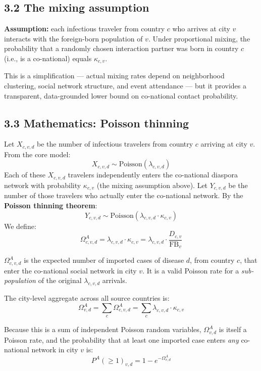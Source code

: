 \documentclass[11pt]{article}
\begin{document}
\subsection*{3.2 The mixing assumption}

\textbf{Assumption:} each infectious traveler from country $c$ who arrives
at city $v$ interacts with the foreign-born population of $v$. Under
proportional mixing, the probability that a randomly chosen interaction
partner was born in country $c$ (i.e., is a co-national) equals
$\kappa_{c,v}$.

This is a simplification --- actual mixing rates depend on neighborhood
clustering, social network structure, and event attendance --- but it
provides a transparent, data-grounded lower bound on co-national contact
probability.

\subsection*{3.3 Mathematics: Poisson thinning}

Let $X_{c,v,d}$ be the number of infectious travelers from country $c$
arriving at city $v$. From the core model:
\[
  X_{c,v,d} \sim \text{Poisson}(\lambda_{c,v,d})
\]
Each of these $X_{c,v,d}$ travelers independently enters the co-national
diaspora network with probability $\kappa_{c,v}$ (the mixing assumption
above). Let $Y_{c,v,d}$ be the number of those travelers who actually
enter the co-national network. By the \textbf{Poisson thinning theorem}:
\[
  Y_{c,v,d} \sim \text{Poisson}(\lambda_{c,v,d} \cdot \kappa_{c,v})
\]
We define:
\begin{equation}
  \Omega^A_{c,v,d} = \lambda_{c,v,d} \cdot \kappa_{c,v}
    = \lambda_{c,v,d} \cdot \frac{D_{c,v}}{\mathrm{FB}_{v}}
  \label{eq:omegaA}
\end{equation}

$\Omega^A_{c,v,d}$ is the expected number of imported cases of disease
$d$, from country $c$, that enter the co-national social network in
city $v$. It is a valid Poisson rate for a \emph{sub-population} of
the original $\lambda_{c,v,d}$ arrivals.

The city-level aggregate across all source countries is:
\[
  \Omega^A_{v,d} = \sum_c \Omega^A_{c,v,d}
    = \sum_c \lambda_{c,v,d} \cdot \kappa_{c,v}
\]

Because this is a sum of independent Poisson random variables,
$\Omega^A_{v,d}$ is itself a Poisson rate, and the probability that at
least one imported case enters \emph{any} co-national network in city $v$
is:
\begin{equation}
  P^A(\geq 1)_{v,d} = 1 - e^{-\Omega^A_{v,d}}
  \label{eq:probA}
\end{equation}
\end{document}
